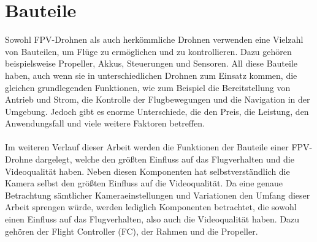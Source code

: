 
\section[Bauteile]{Bauteile}
    Sowohl FPV-Drohnen als auch herkömmliche Drohnen verwenden eine Vielzahl von Bauteilen,
    um Flüge zu ermöglichen und zu kontrollieren. Dazu gehören beispielsweise Propeller, Akkus,
    Steuerungen und Sensoren. All diese Bauteile haben, auch wenn sie in unterschiedlichen
    Drohnen zum Einsatz kommen, die gleichen grundlegenden Funktionen, wie zum Beispiel die
    Bereitstellung von Antrieb und Strom, die Kontrolle der Flugbewegungen und die Navigation
    in der Umgebung. Jedoch gibt es enorme Unterschiede, die den Preis, die Leistung, den
    Anwendungsfall und viele weitere Faktoren betreffen. \\
    \\
    Im weiteren Verlauf dieser Arbeit werden die Funktionen der Bauteile einer FPV-Drohne
    dargelegt, welche den größten Einfluss auf das Flugverhalten und die Videoqualität haben.
    Neben diesen Komponenten hat selbstverständlich die Kamera selbst den größten Einfluss auf
    die Videoqualität. Da eine genaue Betrachtung sämtlicher Kameraeinstellungen und Variationen
    den Umfang dieser Arbeit sprengen würde, werden lediglich Komponenten betrachtet, die sowohl
    einen Einfluss auf das Flugverhalten, also auch die Videoqualität haben. Dazu gehören der
    Flight Controller (FC), der Rahmen und die Propeller.
   
